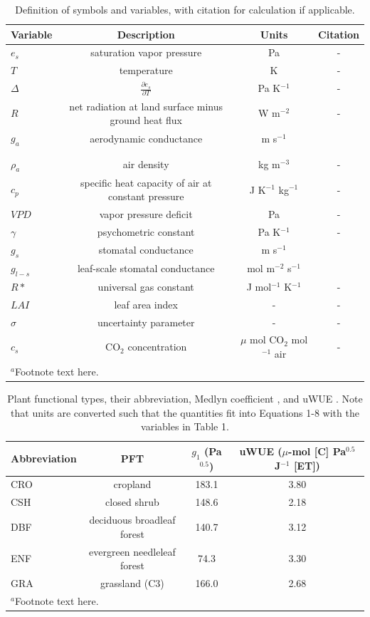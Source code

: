 \documentclass[draft,linenumbers]{agujournal}
\begin{document}
\begin{table}
\caption{Definition of symbols and variables, with citation for calculation if applicable.}
\centering
\begin{tabular}{l c c c}
\hline
 Variable & Description & Units & Citation \\
\hline
$e_s$  & saturation vapor pressure & Pa  & - \\ 
$T$  & temperature  & K & - \\
$\Delta$  & $\frac{\partial e_s}{\partial T}$ & Pa K$^{-1}$ & - \\
$R$  & net radiation at land surface minus ground heat flux & W m$^{-2}$   & - \\
  $g_a$  & aerodynamic conductance & m s$^{-1}$  & \makecell{\cite{Thom_1977} \\ \cite{Paulson_1970} \\ \cite{Beljaars_1991}} \\
  $\rho_a$  & air density & kg m$^{-3}$  & - \\
  $c_p$  & specific heat capacity of air at constant pressure & J K$^{-1}$ kg$^{-1}$ & - \\
  $VPD$  & vapor pressure deficit & Pa  & - \\
  $\gamma$  & psychometric constant & Pa K$^{-1}$   & - \\
  $g_s$  & stomatal conductance & m s$^{-1}$  & \cite{MEDLYN_2011} \\
  $g_{l-s}$  & leaf-scale stomatal conductance & mol m$^{-2}$ s$^{-1}$  & \cite{MEDLYN_2011} \\
  $R*$ & universal gas constant & J mol$^{-1}$ K$^{-1}$ & - \\
  $LAI$ & leaf area index & -& - \\
  $\sigma$ & uncertainty parameter & -& - \\
  $c_s$ & CO$_2$ concentration & $\mu$ mol CO$_2$ mol$^{-1}$ air& - \\
\hline
\multicolumn{2}{l}{$^{a}$Footnote text here.}
\end{tabular}
\end{table}




\begin{table}
  \label{pft}
\caption{Plant functional types, their abbreviation, Medlyn coefficient \citep[from ][]{Lin_2015}, and uWUE \citep[from ][]{Zhou_2015}. Note that units are converted such that the quantities fit into Equations 1-8 with the variables in Table 1.}
\centering
\begin{tabular}{l c c c}
  \hline
  Abbreviation & PFT & $g_1$ (Pa$^{0.5}$) & uWUE ($\mu$-mol [C] Pa$^{0.5}$ J$^{-1}$ [ET])  \\
  \hline
  CRO & cropland & 183.1 & 3.80 \\
  CSH & closed shrub & 148.6 & 2.18 \\
  DBF & deciduous broadleaf forest & 140.7 & 3.12 \\
  ENF & evergreen needleleaf forest & 74.3 & 3.30 \\
  GRA & grassland (C3) & 166.0 & 2.68 \\
\hline
\multicolumn{2}{l}{$^{a}$Footnote text here.}
\end{tabular}
\end{table}
\end{document}
